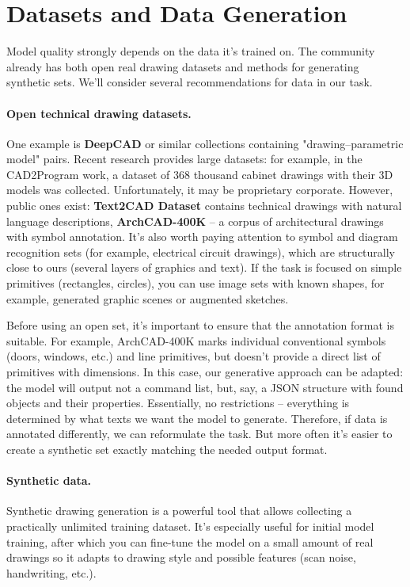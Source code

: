 \documentclass{article}
\begin{document}
\section{Datasets and Data Generation}

Model quality strongly depends on the data it's trained on. The community already has both open real drawing datasets and methods for generating synthetic sets. We'll consider several recommendations for data in our task.

\paragraph{Open technical drawing datasets.} One example is \textbf{DeepCAD} or similar collections containing "drawing–parametric model" pairs. Recent research provides large datasets: for example, in the CAD2Program work, a dataset of 368 thousand cabinet drawings with their 3D models was collected. Unfortunately, it may be proprietary corporate. However, public ones exist: \textbf{Text2CAD Dataset} contains technical drawings with natural language descriptions, \textbf{ArchCAD-400K} – a corpus of architectural drawings with symbol annotation. It's also worth paying attention to symbol and diagram recognition sets (for example, electrical circuit drawings), which are structurally close to ours (several layers of graphics and text). If the task is focused on simple primitives (rectangles, circles), you can use image sets with known shapes, for example, generated graphic scenes or augmented sketches.

Before using an open set, it's important to ensure that the annotation format is suitable. For example, ArchCAD-400K marks individual conventional symbols (doors, windows, etc.) and line primitives, but doesn't provide a direct list of primitives with dimensions. In this case, our generative approach can be adapted: the model will output not a command list, but, say, a JSON structure with found objects and their properties. Essentially, no restrictions – everything is determined by what texts we want the model to generate. Therefore, if data is annotated differently, we can reformulate the task. But more often it's easier to create a synthetic set exactly matching the needed output format.

\paragraph{Synthetic data.} Synthetic drawing generation is a powerful tool that allows collecting a practically unlimited training dataset. It's especially useful for initial model training, after which you can fine-tune the model on a small amount of real drawings so it adapts to drawing style and possible features (scan noise, handwriting, etc.).
\end{document}
